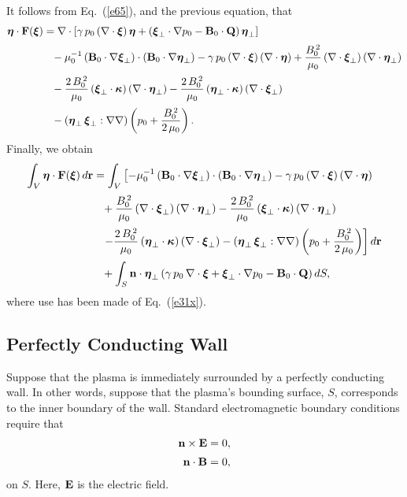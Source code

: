 \documentclass[12pt,prb,aps,notitlepage]{revtex4-1}
\newcommand{\bxi}{\mbox{\boldmath$\xi$}}
\newcommand{\bta}{\mbox{\boldmath$\eta$}}
\newcommand{\bkappa}{\mbox{\boldmath$\kappa$}}
\begin{document}
It follows from Eq.~(\ref{e65}), and the previous equation, that 
 \begin{align}
 \bta\cdot {\bf F}(\bxi) &=\nabla\cdot\left[\gamma\,p_0\,(\nabla\cdot\bxi)\,\bta+ (\bxi_\perp\cdot\nabla p_0-{\bf B}_0\cdot{\bf Q})\,\bta_\perp\right]\nonumber\\[0.5ex]
&\phantom{=}
  - \mu_0^{-1}\,({\bf B}_0\cdot\nabla\bxi_\perp)\cdot
 ({\bf B}_0\cdot\nabla\bta_\perp)-\gamma\,p_0\,(\nabla\cdot\bxi)\,(\nabla\cdot\bta)+\frac{B_0^{\,2}}{\mu_0}\,(\nabla\cdot\bxi_\perp)\,(\nabla\cdot\bta_\perp) 
\nonumber\\[0.5ex]
 &\phantom{=}-\frac{2\,B_0^{\,2}}{\mu_0}\,(\bxi_\perp\cdot\bkappa)\, (\nabla\cdot\bta_\perp)-\frac{2\,B_0^{\,2}}{\mu_0}\,(\bta_\perp\cdot\bkappa)\,(\nabla\cdot\bxi_\perp)\nonumber\\[0.5ex]
 &\phantom{=}
 -(\bta_\perp\,\bxi_\perp : \nabla\nabla)\left(p_0 + \frac{B_0^{\,2}}{2\,\mu_0}\right).
\end{align}
Finally, we obtain 
 \begin{align}\label{e83d}
\int_V \bta\cdot{\bf F}(\bxi)\,d{\bf r} &=\int_V \left[- \mu_0^{-1}\,({\bf B}_0\cdot\nabla\bxi_\perp)\cdot
 ({\bf B}_0\cdot\nabla\bta_\perp)-\gamma\,p_0\,(\nabla\cdot\bxi)\,(\nabla\cdot\bta)
\right.\nonumber\\[0.5ex]
 &\phantom{=}+\frac{B_0^{\,2}}{\mu_0}\,(\nabla\cdot\bxi_\perp)\,(\nabla\cdot\bta_\perp) -\frac{2\,B_0^{\,2}}{\mu_0}\,(\bxi_\perp\cdot\bkappa)\, (\nabla\cdot\bta_\perp)\nonumber\\[0.5ex]
 &\phantom{=}\left.
 -\frac{2\,B_0^{\,2}}{\mu_0}\,(\bta_\perp\cdot\bkappa)\,(\nabla\cdot\bxi_\perp)-(\bta_\perp\,\bxi_\perp : \nabla\nabla)\left(p_0 + \frac{B_0^{\,2}}{2\,\mu_0}\right)\right]d{\bf r}\nonumber\\[0.5ex]
 &\phantom{=}+ \int_S {\bf n}\cdot\bta_\perp\left(\gamma\,p_0\,\nabla\cdot\bxi + \bxi_\perp\cdot\nabla p_0 - {\bf B}_0\cdot{\bf Q}\right)dS,
\end{align}
where use has been made of Eq.~(\ref{e31x}).

\subsection{Perfectly Conducting Wall}
Suppose that the plasma is immediately surrounded by a perfectly conducting wall. In other words, suppose that the plasma's bounding surface, $S$, corresponds to the inner
boundary of the wall. 
Standard electromagnetic boundary conditions 
require that
\begin{align}\label{e27a}
{\bf n}\times {\bf E}&= 0,\\[0.5ex]
{\bf n} \cdot {\bf B}&=0,\label{e27b}
\end{align}
on $S$. Here, ${\bf E}$ is the electric field. 
\end{document}
